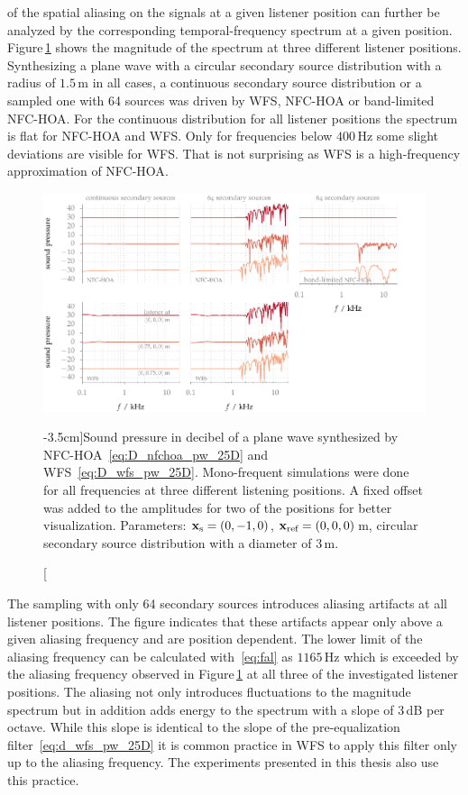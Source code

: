  of the spatial aliasing on the signals at a given
listener position can further be analyzed by the corresponding temporal-frequency
spectrum at a given position.
Figure\,\ref{fig:freq_response} shows the magnitude of the spectrum at
three different listener positions. Synthesizing a plane wave
with a circular secondary source distribution with a radius of $1.5$\,m in all
cases, a continuous secondary source distribution or a sampled one with 64 sources was
driven by \ac{WFS}, \ac{NFC-HOA} or band-limited \ac{NFC-HOA}. For the
continuous distribution for all listener positions the spectrum is flat
for \ac{NFC-HOA} and \ac{WFS}. Only for frequencies below $400$\,Hz some slight
deviations are visible for \ac{WFS}. That is not surprising as \ac{WFS} is a
high-frequency approximation of \ac{NFC-HOA}.
%
\begin{figure}[t]
    \includegraphics{fig3_12/fig3_12}
    \caption[][-3.5cm]{Sound pressure in decibel of a plane wave synthesized by
    \ac{NFC-HOA}~\protect\eqref{eq:D_nfchoa_pw_25D} and
    \ac{WFS}~\protect\eqref{eq:D_wfs_pw_25D}. Mono-frequent simulations were
    done for all frequencies at three different listening positions. A fixed
    offset was added to the amplitudes for two of the positions for better
    visualization.
    Parameters: $\mathbf{x}_\text{s} = (0,-1,0)$, $\mathbf{x}_\text{ref} = (0,0,0)$\,m, circular secondary
    source distribution with a diameter of $3$\,m.
    }
    \label{fig:freq_response}
\end{figure}
%

The sampling with only 64 secondary sources introduces aliasing artifacts at all listener
positions. The figure indicates that these artifacts appear only above a given
aliasing frequency and are position dependent. The lower limit of the aliasing
frequency can be calculated with~\eqref{eq:fal} as $1165$\,Hz
which is exceeded by the aliasing frequency observed in
Figure\,\ref{fig:freq_response}
at all three of the investigated listener positions. The
aliasing not only introduces fluctuations to the magnitude spectrum but
in addition adds energy to the spectrum with a slope of $3$\,dB per octave.
While
this slope is identical to the slope of the pre-equalization
filter~\eqref{eq:d_wfs_pw_25D} it is common practice in \ac{WFS} to apply this
filter only up to the aliasing frequency. The experiments presented in this
thesis also use this practice.

